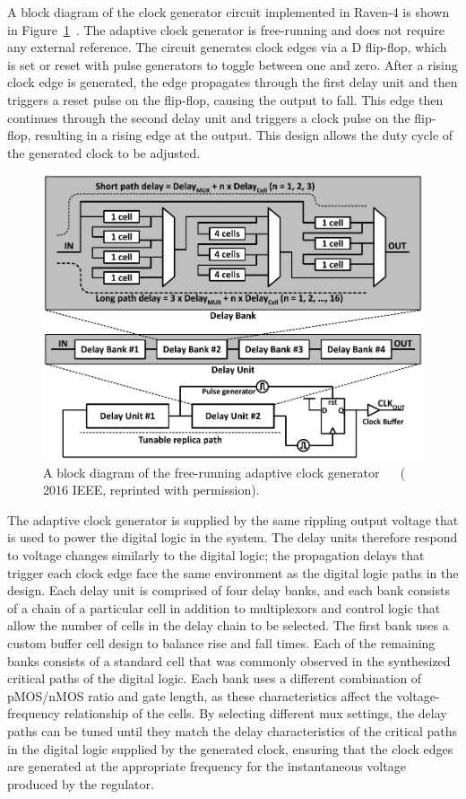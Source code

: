 \documentclass[graybox]{svmult}
\begin{document}
A block diagram of the clock generator circuit implemented in Raven-4 is shown in Figure~\ref{fig:3-clockgen}~\cite{Keller2017}.
The adaptive clock generator is free-running and does not require any external reference.
The circuit generates clock edges via a D flip-flop, which is set or reset with pulse generators to toggle between one and zero.
After a rising clock edge is generated, the edge propagates through the first delay unit and then triggers a reset pulse on the flip-flop, causing the output to fall.
This edge then continues through the second delay unit and triggers a clock pulse on the flip-flop, resulting in a rising edge at the output.
This design allows the duty cycle of the generated clock to be adjusted.

\begin{figure}
  \centering
  \includegraphics[width=\textwidth]{3-clockgen}
  \caption{A block diagram of the free-running adaptive clock generator~\cite{Keller2017} ~\cite{Keller2016} ({\textcopyright} 2016 IEEE, reprinted with permission).}
  \label{fig:3-clockgen}
\end{figure}

The adaptive clock generator is supplied by the same rippling output voltage that is used to power the digital logic in the system.
The delay units therefore respond to voltage changes similarly to the digital logic; the propagation delays that trigger each clock edge face the same environment as the digital logic paths in the design.
Each delay unit is comprised of four delay banks, and each bank consists of a chain of a particular cell in addition to multiplexors and control logic that allow the number of cells in the delay chain to be selected.
The first bank uses a custom buffer cell design to balance rise and fall times.
Each of the remaining banks consists of a standard cell that was commonly observed in the synthesized critical paths of the digital logic.
Each bank uses a different combination of pMOS/nMOS ratio and gate length, as these characteristics affect the voltage-frequency relationship of the cells.
By selecting different mux settings, the delay paths can be tuned until they match the delay characteristics of the critical paths in the digital logic supplied by the generated clock, ensuring that the clock edges are generated at the appropriate frequency for the instantaneous voltage produced by the regulator.
\end{document}
